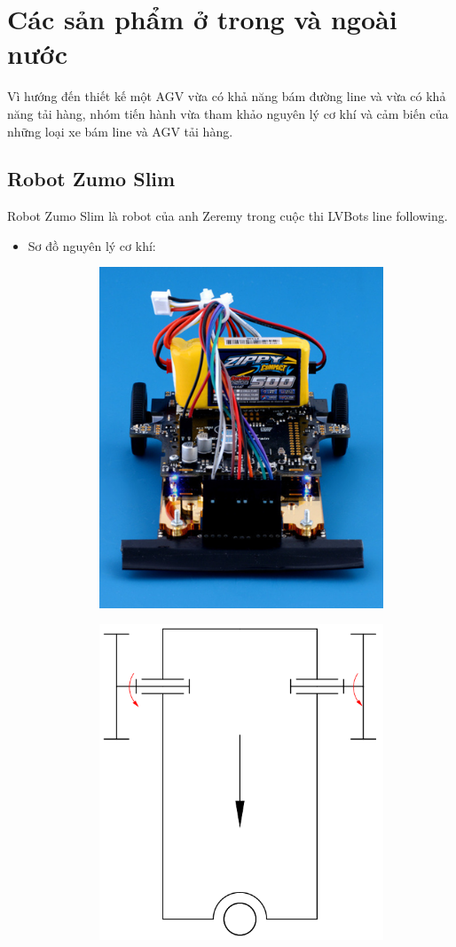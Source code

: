     \section{Các sản phẩm ở trong và ngoài nước}
    \hspace*{0.6cm}Vì hướng đến thiết kế một AGV vừa có khả năng bám đường line và vừa có khả năng tải hàng, nhóm tiến hành vừa tham khảo nguyên lý cơ khí và cảm biến của những loại xe bám line và AGV tải hàng. 
    \subsection{Robot Zumo Slim}
        \hspace*{0.6cm}Robot Zumo Slim là robot của anh Zeremy trong cuộc thi LVBots line following.
        \begin{itemize}
            \item Sơ đồ nguyên lý cơ khí:
            \begin{figure}[H]
                \begin{subfigure}{0.5\textwidth}
                \centering
                \includegraphics[width=0.5\linewidth, right]{pictures/chapter1/chapter1_pic_10a_zumo_slim.png} 
                \label{chap1_pic10a}
                \end{subfigure}
                \begin{subfigure}{0.6\textwidth}
                \includegraphics[width=0.5\linewidth]{pictures/chapter1/chapter1_pic_10b_zumo_slim.png}

\end{subfigure}
\end{figure}
\end{itemize}
